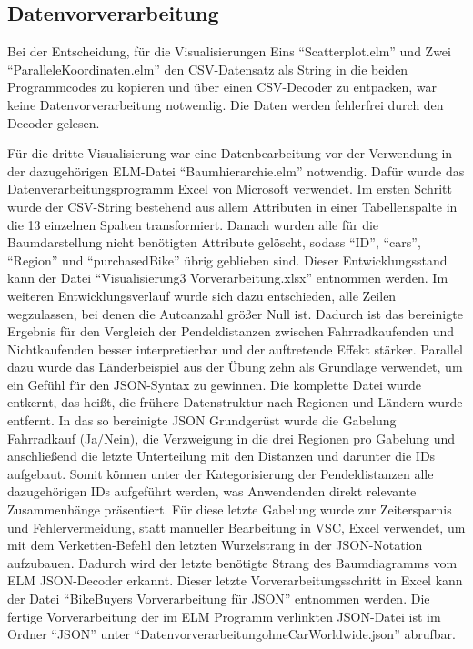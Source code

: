 \documentclass[usegeometry=true]{scrartcl}
\begin{document}
\subsection{Datenvorverarbeitung}
Bei der Entscheidung, für die Visualisierungen Eins "`Scatterplot.elm"' und Zwei "`ParalleleKoordinaten.elm"' den CSV-Datensatz als String in die beiden Programmcodes zu kopieren und über einen CSV-Decoder zu entpacken, war keine Datenvorverarbeitung notwendig. Die Daten werden fehlerfrei durch den Decoder gelesen.

Für die dritte Visualisierung war eine Datenbearbeitung vor der Verwendung in der dazugehörigen ELM-Datei "`Baumhierarchie.elm"' notwendig.
Dafür wurde das Datenverarbeitungsprogramm Excel von Microsoft verwendet. 
Im ersten Schritt wurde der CSV-String bestehend aus allem Attributen in einer Tabellenspalte in die 13 einzelnen Spalten transformiert. Danach wurden alle für die Baumdarstellung nicht benötigten Attribute gelöscht, sodass "`ID"', "`cars"', "`Region"' und "`purchasedBike"' übrig geblieben sind. Dieser Entwicklungsstand kann der Datei "`Visualisierung3 Vorverarbeitung.xlsx"' entnommen werden. Im weiteren Entwicklungsverlauf wurde sich dazu entschieden, alle Zeilen  wegzulassen, bei denen die Autoanzahl größer Null ist. Dadurch ist das bereinigte Ergebnis für den Vergleich der Pendeldistanzen zwischen Fahrradkaufenden und Nichtkaufenden besser interpretierbar und der auftretende Effekt stärker. 
Parallel dazu wurde das Länderbeispiel aus der Übung zehn als Grundlage verwendet, um ein Gefühl für den JSON-Syntax zu gewinnen. Die komplette Datei wurde entkernt, das heißt, die frühere Datenstruktur nach Regionen und  Ländern wurde entfernt. In das so bereinigte JSON Grundgerüst wurde die Gabelung Fahrradkauf (Ja/Nein), die  Verzweigung in die drei Regionen pro Gabelung und anschließend die letzte Unterteilung mit den Distanzen und darunter die IDs aufgebaut. Somit können unter der Kategorisierung der Pendeldistanzen alle dazugehörigen IDs aufgeführt werden, was Anwendenden direkt relevante Zusammenhänge präsentiert. Für diese letzte Gabelung wurde zur Zeitersparnis und Fehlervermeidung, statt manueller Bearbeitung in VSC, Excel verwendet, um mit dem Verketten-Befehl den letzten Wurzelstrang in der JSON-Notation aufzubauen. Dadurch wird der letzte benötigte Strang des Baumdiagramms vom ELM JSON-Decoder erkannt. Dieser letzte Vorverarbeitungsschritt in Excel kann der Datei "`BikeBuyers Vorverarbeitung für JSON"' entnommen werden.
Die fertige Vorverarbeitung der im ELM Programm verlinkten JSON-Datei ist im Ordner "`JSON"' unter "`DatenvorverarbeitungohneCarWorldwide.json"' abrufbar.
\end{document}
